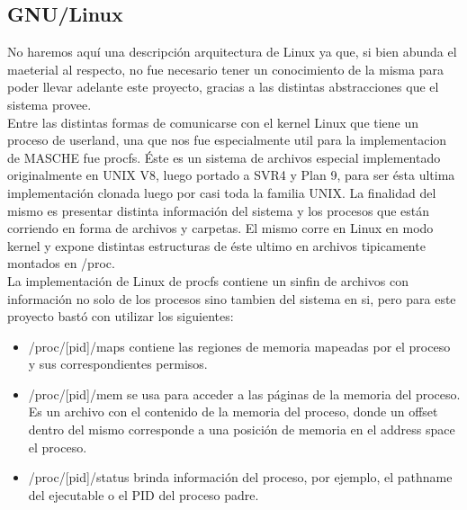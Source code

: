 \subsection{GNU/Linux}

No haremos aquí una descripción arquitectura de Linux ya que, si bien abunda el
maeterial al respecto, no fue necesario tener un conocimiento de la misma para
poder llevar adelante este proyecto, gracias a las distintas abstracciones que
el sistema provee.\\

Entre las distintas formas de comunicarse con el kernel Linux que tiene un
proceso de userland, una que nos fue especialmente util para la implementacion
de MASCHE fue procfs. Éste es un sistema de archivos especial implementado
originalmente en UNIX V8, luego portado a SVR4 y Plan 9, para ser ésta ultima
implementación clonada luego por casi toda la familia UNIX. La finalidad del
mismo es presentar distinta información del sistema y los procesos que están
corriendo en forma de archivos y carpetas. El mismo corre en Linux en modo
kernel y expone distintas estructuras de éste ultimo en archivos tipicamente
montados en /proc.\\

La implementación de Linux de procfs contiene un sinfin de archivos con
información no solo de los procesos sino tambien del sistema en si, pero para
este proyecto bastó con utilizar los siguientes:\\

\begin{itemize}

\item /proc/[pid]/maps contiene las regiones de memoria mapeadas por el proceso
    y sus correspondientes permisos.

\item /proc/[pid]/mem se usa para acceder a las páginas de la memoria del
    proceso. Es un archivo con el contenido de la memoria del proceso, donde un
    offset dentro del mismo corresponde a una posición de memoria en el address
    space el proceso.

\item /proc/[pid]/status brinda información del proceso, por ejemplo, el
    pathname del ejecutable o el PID del proceso padre.

\end{itemize}
